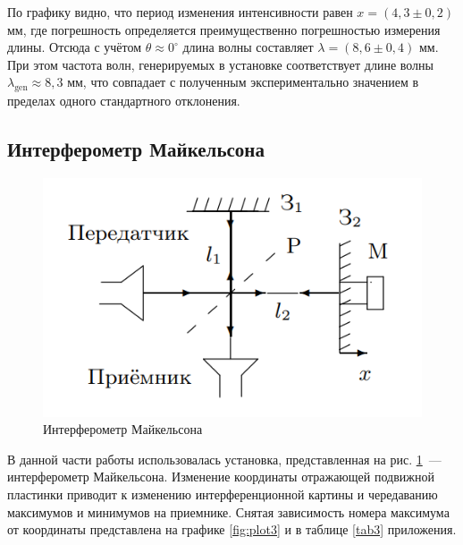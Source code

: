 По графику видно, что период изменения интенсивности равен $x=(4,3\pm0,2)$ мм, где погрешность определяется преимущественно погрешностью измерения длины. Отсюда с учётом $\theta\approx 0^\circ$ длина волны составляет $\lambda = (8,6 \pm 0,4)\text{ мм}$. При этом частота волн, генерируемых в установке соответствует длине волны $\lambda_{\text{gen}} \approx 8,3\text{ мм}$, что совпадает с полученным экспериментально значением в пределах одного стандартного отклонения.

\subsection{Интерферометр Майкельсона}
\begin{figure}[H]
    \centering
    \includegraphics[scale=0.7]{pic/Michelson.png}
    \caption{Интерферометр Майкельсона}
    \label{fig:Michelson}
\end{figure}

В данной части работы использовалась установка, представленная на рис. \ref{fig:Michelson}~--- интерферометр Майкельсона. Изменение координаты отражающей подвижной пластинки приводит к изменению интерференционной картины и чередаванию максимумов и минимумов на приемнике. Снятая зависимость номера максимума от координаты представлена на графике \ref{fig:plot3} и в таблице \ref{tab3} приложения. 


